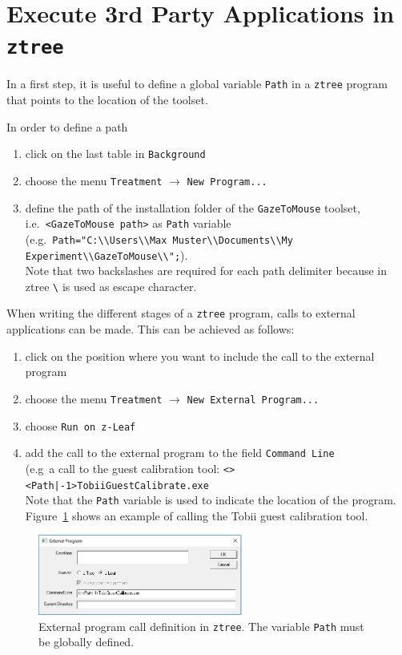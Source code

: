 \documentclass[a4paper,oneside]{book}
\begin{document}
\section{Execute 3rd Party Applications in \texttt{ztree}}
\label{sec.external}
In a first step, it is useful to define a global variable \texttt{Path} in a \texttt{ztree} program that points to the location of the toolset.

In order to define a path
\begin{enumerate}
    \item click on the last table in \texttt{Background}
    \item choose the menu \texttt{Treatment} $\rightarrow$ \texttt{New Program...}
    \item define the path of the installation folder of the \texttt{GazeToMouse} toolset, i.e.~\texttt{<GazeToMouse path>} as \texttt{Path} variable\\
        (e.g.~\texttt{Path="C:\textbackslash\textbackslash Users\textbackslash\textbackslash Max Muster\textbackslash\textbackslash Documents\textbackslash\textbackslash My Experiment\textbackslash\textbackslash GazeToMouse\textbackslash\textbackslash";}). \\
        Note that two backslashes are required for each path delimiter because in ztree \texttt{\textbackslash} is used as escape character.
\end{enumerate}

When writing the different stages of a \texttt{ztree} program, calls to external applications can be made.
This can be achieved as follows:
\begin{enumerate}
    \item click on the position where you want to include the call to the external program
    \item choose the menu \texttt{Treatment} $\rightarrow$ \texttt{New External Program...}
    \item choose \texttt{Run on z-Leaf}
    \item add the call to the external program to the field \texttt{Command Line} \\
        (e.g~a call to the guest calibration tool: \texttt{<><Path|-1>TobiiGuestCalibrate.exe}\\
        Note that the \texttt{Path} variable is used to indicate the location of the program.
        Figure~\ref{fig.extcall} shows an example of calling the Tobii guest calibration tool.
\end{enumerate}
\begin{figure}[ht]
    \centering
    \includegraphics[width=0.6\textwidth]{ztree_extcall.png}
    \caption{External program call definition in \texttt{ztree}. The variable \texttt{Path} must be globally defined.}
    \label{fig.extcall}
\end{figure}
\end{document}
